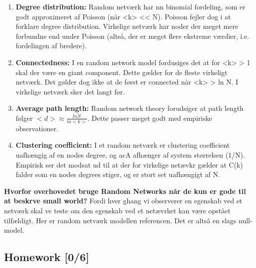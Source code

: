 \documentclass[11pt]{article}
\begin{document}
\begin{enumerate}
\item \textbf{Degree distribution:} Random netværk har nn binomial fordeling, som er godt approximeret af Poisson (når <k> << N). Poisson fejler dog i at forklare degree distribution. Virkelige netværk har noder der meget mere forbundne end under Poisson (altså, der er meget flere ekstreme værdier, i.e. fordelingen af bredere).
\item \textbf{Connectedness:} I en random network model fordusiges det at for <k> > 1 skal der være en giant component. Dette gælder for de fleste virkeligt netværk. Det gølder dog ikke at de først er connected når <k> > ln N. I virkelige netværk sker det langt før.
\item \textbf{Average path length:} Random network theory forudsiger at path length følger \(<d> \approx \frac{ln N}{ln <k>}\). Dette passer meget godt med empiriske observationer.
\item \textbf{Clustering coefficient:} I et random netværk er clustering coefficient uafhængig af en nodes degree, og acA afhænger af system størrelsen (1/N). Empirisk ser det modsat ud til at der for virkelige netævkr gælder at C(k) falder som en nodes degrees stiger, og er stort set uafhængigt af N.
\end{enumerate}

\textbf{Hvorfor overhovedet bruge Random Networks når de kun er gode til at beskrve small world?} Fordi hver ghang vi observerer en egenskab ved et netværk skal ve teste om den egenskab ved et netævrket kan være opstået tilfældigt. Her er random netværk modellen referencen. Det er altså en slags null-model.

\subsection{Homework [0/6]}
\label{sec:org231d156}
\end{document}
